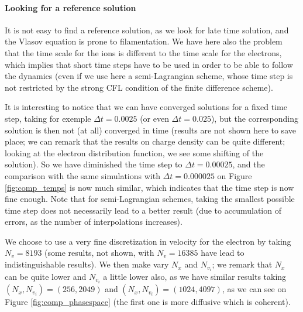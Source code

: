 \documentclass{article}
\numberwithin{equation}{section}
\begin{document}
\paragraph{Looking for a reference solution} %

It is not easy to find a reference solution, as we look for late time solution, and the Vlasov equation is prone to filamentation. We have here also the problem that the time scale for the ions is different to the time scale for the electrons, which implies that short time steps have to be used in order to be able to follow the dynamics (even if we use here a semi-Lagrangian scheme, whose time step is not restricted by the strong CFL condition
of the finite difference scheme).

It is interesting to notice that we can have converged solutions for a fixed time step, taking for exemple $\Delta t = 0.0025$ (or even $\Delta t =0.025$), but the corresponding solution is then not (at all) converged in time
(results are not shown here to save place; we can remark that the results on charge density can be quite different; looking at the electron distribution function, we see some shifting
of the solution). So we have diminished the time step to $\Delta t = 0.00025$, and the comparison with the same simulations with  $\Delta t = 0.000025$ on Figure \ref{fig:comp_temps} 
is now much similar, which indicates that the 
time step is now fine enough. Note that for semi-Lagrangian schemes, taking the smallest possible time step does not necessarily lead to a better result (due to accumulation of errors, as the number of interpolations 
increases).

We choose to use a very fine discretization in velocity for the electron by taking $N_v=8193$ (some results, not shown, with $N_v=16385$ have lead to indistinguishable results).
We then make vary $N_x$ and $N_{v_i}$; we remark that $N_x$ can be quite lower and $N_{v_i}$ a little lower also, as we have similar results taking $(N_x,N_{v_i})=(256,2049)$ and 
$(N_x,N_{v_i})=(1024,4097)$, as we can see on Figure \ref{fig:comp_phasespace} (the first one is more diffusive which is coherent). 
\end{document}
